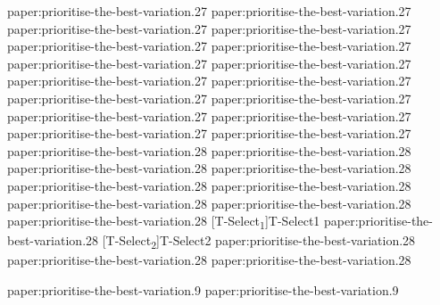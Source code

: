 %
{paper:prioritise-the-best-variation.27}
%
{paper:prioritise-the-best-variation.27}
%
{paper:prioritise-the-best-variation.27}
%
{paper:prioritise-the-best-variation.27}
%
{paper:prioritise-the-best-variation.27}
%
{paper:prioritise-the-best-variation.27}
%
{paper:prioritise-the-best-variation.27}
%
{paper:prioritise-the-best-variation.27}
%
{paper:prioritise-the-best-variation.27}
%
{paper:prioritise-the-best-variation.27}
%
{paper:prioritise-the-best-variation.27}
%
{paper:prioritise-the-best-variation.27}
%
{paper:prioritise-the-best-variation.27}
%
{paper:prioritise-the-best-variation.27}
%
{paper:prioritise-the-best-variation.27}
%
{paper:prioritise-the-best-variation.27}
%
{paper:prioritise-the-best-variation.28}
%
{paper:prioritise-the-best-variation.28}
%
{paper:prioritise-the-best-variation.28}
%
{paper:prioritise-the-best-variation.28}
%
{paper:prioritise-the-best-variation.28}
%
{paper:prioritise-the-best-variation.28}
%
{paper:prioritise-the-best-variation.28}
%
{paper:prioritise-the-best-variation.28}
%
{paper:prioritise-the-best-variation.28}
[T-Select\textsubscript{1}]{T-Select1}%
{paper:prioritise-the-best-variation.28}
[T-Select\textsubscript{2}]{T-Select2}%
{paper:prioritise-the-best-variation.28}
%
{paper:prioritise-the-best-variation.28}
%
{paper:prioritise-the-best-variation.28}

%
{paper:prioritise-the-best-variation.9}
%
{paper:prioritise-the-best-variation.9}


